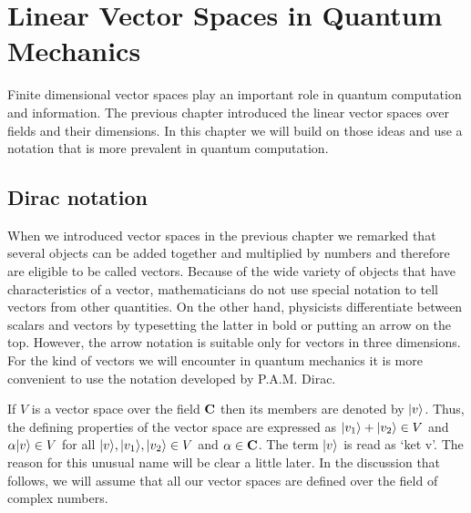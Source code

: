 \chapter{Linear Vector Spaces in Quantum Mechanics}\label{c2}
Finite dimensional vector spaces play an important role in quantum computation
and information. The previous chapter introduced the linear vector spaces over
fields and their dimensions. In this chapter we will build on those ideas and
use a notation that is more prevalent in quantum computation.

\section{Dirac notation}\label{c2s1}
When we introduced vector spaces in the previous chapter we remarked that 
several objects can be added together and multiplied by numbers and therefore
are eligible to be called vectors. Because of the wide variety of objects that
have characteristics of a vector, mathematicians do not use special notation
to tell vectors from other quantities. On the other hand, physicists 
differentiate between scalars and vectors by typesetting the latter in bold
or putting an arrow on the top. However, the arrow notation is suitable only
for vectors in three dimensions. For the kind of vectors we will encounter
in quantum mechanics it is more convenient to use the notation developed by
P.A.M. Dirac.

If $V$ is a vector space over the field $\mathbf{C}$ then its members are denoted
by $\lvert v\rangle$. Thus, the defining properties of the vector space are expressed
as $\lvert v_1\rangle + \lvert v_2\rangle \in V$ and $\alpha\lvert v\rangle \in V$ for all $\lvert v\rangle,
\lvert v_1\rangle, \lvert v_2\rangle \in V$ and $\alpha \in \mathbf{C}$. The term $\lvert v\rangle$ is read
as `ket v'. The reason for this unusual name will be clear a little later. In 
the discussion that follows, we will assume that all our vector spaces are
defined over the field of complex numbers.

